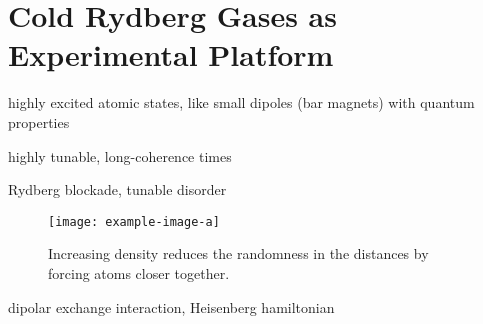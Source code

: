 \chapter{Cold Rydberg Gases as Experimental Platform}
highly excited atomic states, like small dipoles  (bar magnets) with quantum properties

highly tunable, long-coherence times

Rydberg blockade, tunable disorder

\begin{figure}[htb]
	\centering
	\texttt{[image: example-image-a]}
	\caption{Increasing density reduces the randomness in the distances by forcing atoms closer together.}
\end{figure}

dipolar exchange interaction, Heisenberg hamiltonian